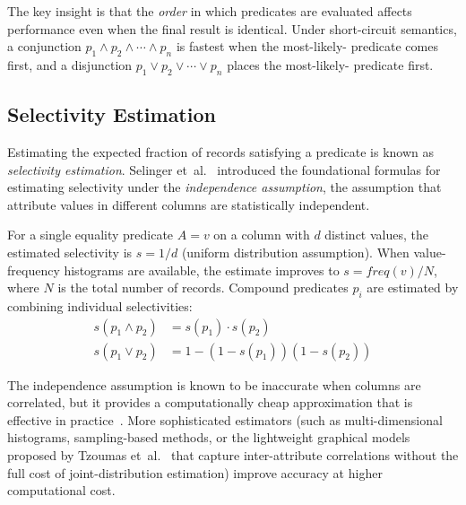 The key insight is that the \emph{order} in which predicates are evaluated affects performance even when the final result is identical.
Under short-circuit semantics, a conjunction $p_1 \land p_2 \land \cdots \land p_n$ is fastest when the most-likely- predicate comes first, and a disjunction $p_1 \lor p_2 \lor \cdots \lor p_n$ places the most-likely- predicate first.

\subsection{Selectivity Estimation}

Estimating the expected fraction of records satisfying a predicate is known as \emph{selectivity estimation}.
Selinger et~al.~\cite{selingerAccessPathSelection1979} introduced the foundational formulas for estimating selectivity under the \emph{independence assumption}, the assumption that attribute values in different columns are statistically independent.

For a single equality predicate $A = v$ on a column with $d$ distinct values, the estimated selectivity is $s = 1/d$ (uniform distribution assumption).
When value-frequency histograms are available, the estimate improves to $s = \mathit{freq}(v) / N$, where $N$ is the total number of records.
Compound predicates $p_i$ are estimated by combining individual selectivities:
\begin{equation}\label{eq:selectivity_theory}
\begin{aligned}
    s(p_1 \land p_2) &= s(p_1) \cdot s(p_2)\\
    s(p_1 \lor p_2) &= 1 - (1 - s(p_1))(1 - s(p_2))
\end{aligned}
\end{equation}

The independence assumption is known to be inaccurate when columns are correlated, but it provides a computationally cheap approximation that is effective in practice~\cite{selingerAccessPathSelection1979}.
More sophisticated estimators (such as multi-dimensional histograms, sampling-based methods, or the lightweight graphical models proposed by Tzoumas et~al.~\cite{tzoumasLightweightGraphicalModels2011} that capture inter-attribute correlations without the full cost of joint-distribution estimation) improve accuracy at higher computational cost.

